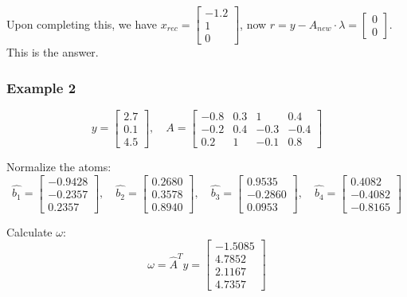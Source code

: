 \documentclass[10pt,a4paper,oneside,numbers=noenddot]{scrbook}
\theoremstyle{ctplain}
\theoremstyle{ctresult}
\begin{document}
Upon completing this, we have $x_{rec} = \begin{bmatrix} -1.2 \\ 1 \\ 0 \end{bmatrix}$,
now $r = y - A_{new} \cdot \lambda = \begin{bmatrix} 0 \\ 0 \end{bmatrix}$.  This is the
answer.

\subsubsection{Example 2}
\[
  y = \begin{bmatrix} 2.7 \\ 0.1 \\ 4.5\end{bmatrix}, \quad 
  A = \begin{bmatrix} -0.8 & 0.3 & 1 & 0.4 \\ -0.2 & 0.4 & -0.3 & -0.4 \\
  0.2 & 1 & -0.1 & 0.8 \end{bmatrix}
\]

Normalize the atoms:
\[
  \hat{b_1} = \begin{bmatrix}-0.9428 \\ -0.2357 \\ 0.2357\end{bmatrix}, \quad
  \hat{b_2} = \begin{bmatrix}0.2680 \\ 0.3578 \\ 0.8940\end{bmatrix}, \quad
  \hat{b_3} = \begin{bmatrix}0.9535 \\ -0.2860 \\ 0.0953\end{bmatrix}, \quad
  \hat{b_4} = \begin{bmatrix}0.4082 \\ -0.4082 \\ -0.8165\end{bmatrix}
\]

Calculate $\omega$:
\[
  \omega = \hat{A}^Ty = \begin{bmatrix} -1.5085 \\ 4.7852 \\ 2.1167 \\ 4.7357
  \end{bmatrix}
\]
\end{document}
